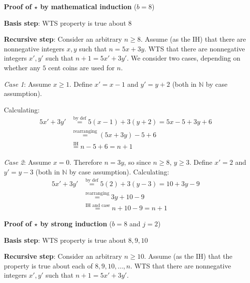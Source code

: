 \documentclass[12pt, oneside]{article}
\begin{document}
\setlength{\columnseprule}{0.4pt}
\begin{multicols}{2}
{\bf  Proof of $\star$ by mathematical induction} ($b=8$)

{\bf Basis step}:  WTS property is true about  $8$
\vspace{50pt}

{\bf Recursive step}: Consider an  arbitrary  $n \geq 8$.
Assume (as the  IH) that  there are nonnegative integers
$x, y$ such that $n =  5x +  3y$.  WTS
that there are nonnegative integers $x', y'$ such
that  $n+1 = 5x' +  3y'$.  We consider two cases, 
depending on  whether  any  $5$ cent coins
are used for $n$.

\vspace{1in}

{\it Case 1}:  Assume $x \geq  1$.
Define $x' = x-1$ and $y'=y+2$ (both in  $\mathbb{N}$ by case assumption).

\vspace{-15pt}

Calculating:
\begin{align*}
5x' +  3y' &\overset{\text{by def}}{=}  5(x-1) +  3(y+2)  = 5x -  5 +3y +   6  \\
&\overset{\text{rearranging}} = (5x+3y) -5  + 6\\
& \overset{\text{IH}}{=} n-5+6 =  n+1
\end{align*}

\vspace{1in}

{\it  Case 2}: Assume $x = 0$.  Therefore  $n  = 3y$,  so 
since  $n \geq 8$, $y \geq 3$. Define $x' = 2$ and $y'=y-3$
(both in $\mathbb{N}$ by case assumption).
Calculating:
\begin{align*}
5x' +  3y' &\overset{\text{by def}}{=}  5(2) +  3(y-3)  = 10  +3y -9  \\
&\overset{\text{rearranging}} = 3y +10 -9 \\
&\overset{\text{IH and case}}{=} n+10-9 =  n+1
\end{align*}

\vspace{1in}

\columnbreak


{\bf Proof of $\star$ by strong induction} ($b=8$ and $j=2$)

{\bf Basis step}:  WTS property is true about  $8, 9, 10$
\vspace{50pt}

{\bf Recursive step}: Consider an  arbitrary  $n \geq 10$.
Assume (as the  IH) that the property is true about  each of $8, 9, 10, \ldots, n$.  
WTS
that there are nonnegative integers $x', y'$ such
that  $n+1 = 5x' +  3y'$.

\vspace{200pt}
\end{multicols}
\end{document}
